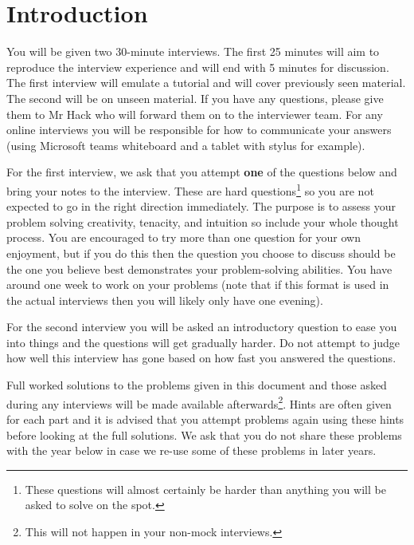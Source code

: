 \section*{Introduction}

You will be given two 30-minute interviews. The first 25 minutes will aim to reproduce the interview experience and will end with 5 minutes for discussion. The first interview will emulate a tutorial and will cover previously seen material. The second will be on unseen material. If you have any questions, please give them to Mr Hack who will forward them on to the interviewer team. For any online interviews you will be responsible for how to communicate your answers (using Microsoft teams whiteboard and a tablet with stylus for example).

For the first interview, we ask that you attempt \textbf{one} of the questions below and bring your notes to the interview. These are hard questions\footnote{These questions will almost certainly be harder than anything you will be asked to solve on the spot.} so you are not expected to go in the right direction immediately. The purpose is to assess your problem solving creativity, tenacity, and intuition so include your whole thought process. You are encouraged to try more than one question for your own enjoyment, but if you do this then the question you choose to discuss should be the one you believe best demonstrates your problem-solving abilities. You have around one week to work on your problems (note that if this format is used in the actual interviews then you will likely only have one evening).

For the second interview you will be asked an introductory question to ease you into things and the questions will get gradually harder. Do not attempt to judge how well this interview has gone based on how fast you answered the questions.

Full worked solutions to the problems given in this document and those asked during any interviews will be made available afterwards\footnote{This will not happen in your non-mock interviews.}. Hints are often given for each part and it is advised that you attempt problems again using these hints before looking at the full solutions. We ask that you do not share these problems with the year below in case we re-use some of these problems in later years.